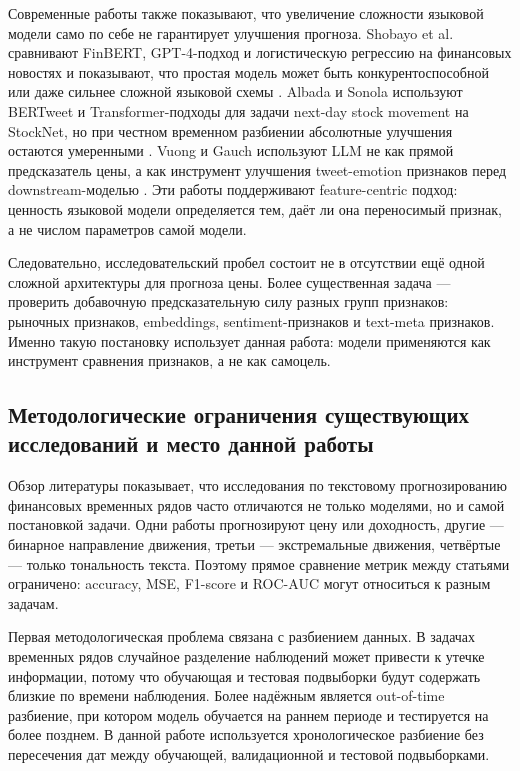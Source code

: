 Современные работы также показывают, что увеличение сложности языковой модели само по себе не гарантирует улучшения прогноза. Shobayo et al. сравнивают FinBERT, GPT-4-подход и логистическую регрессию на финансовых новостях и показывают, что простая модель может быть конкурентоспособной или даже сильнее сложной языковой схемы \cite{shobayo2024sentiment}. Albada и Sonola используют BERTweet и Transformer-подходы для задачи next-day stock movement на StockNet, но при честном временном разбиении абсолютные улучшения остаются умеренными \cite{albada2025bertweet}. Vuong и Gauch используют LLM не как прямой предсказатель цены, а как инструмент улучшения tweet-emotion признаков перед downstream-моделью \cite{vuong2025llm}. Эти работы поддерживают feature-centric подход: ценность языковой модели определяется тем, даёт ли она переносимый признак, а не числом параметров самой модели.

Следовательно, исследовательский пробел состоит не в отсутствии ещё одной сложной архитектуры для прогноза цены. Более существенная задача --- проверить добавочную предсказательную силу разных групп признаков: рыночных признаков, embeddings, sentiment-признаков и text-meta признаков. Именно такую постановку использует данная работа: модели применяются как инструмент сравнения признаков, а не как самоцель.

\subsection{Методологические ограничения существующих исследований и место данной работы}

Обзор литературы показывает, что исследования по текстовому прогнозированию финансовых временных рядов часто отличаются не только моделями, но и самой постановкой задачи. Одни работы прогнозируют цену или доходность, другие --- бинарное направление движения, третьи --- экстремальные движения, четвёртые --- только тональность текста. Поэтому прямое сравнение метрик между статьями ограничено: accuracy, MSE, F1-score и ROC-AUC могут относиться к разным задачам.

Первая методологическая проблема связана с разбиением данных. В задачах временных рядов случайное разделение наблюдений может привести к утечке информации, потому что обучающая и тестовая подвыборки будут содержать близкие по времени наблюдения. Более надёжным является out-of-time разбиение, при котором модель обучается на раннем периоде и тестируется на более позднем. В данной работе используется хронологическое разбиение без пересечения дат между обучающей, валидационной и тестовой подвыборками.

